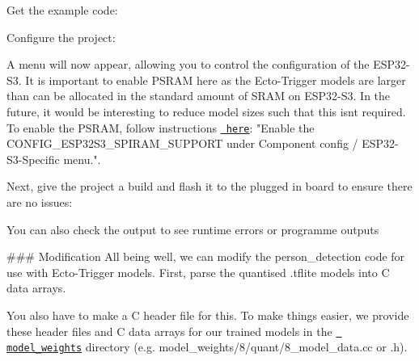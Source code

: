 \begin{adjustwidth}{1em}{0em}
Get the example code\+: 
\begin{DoxyCode}{0}

\end{DoxyCode}


Configure the project\+: 
\begin{DoxyCode}{0}

\end{DoxyCode}
 A menu will now appear, allowing you to control the configuration of the ESP32-\/\+S3. It is important to enable PSRAM here as the Ecto-\/\+Trigger models are larger than can be allocated in the standard amount of SRAM on ESP32-\/\+S3. In the future, it would be interesting to reduce model sizes such that this isn\textquotesingle{}t required. To enable the PSRAM, follow instructions \href{https://docs.espressif.com/projects/esp-idf/en/release-v4.4/esp32s3/api-guides/flash_psram_config.html}{\texttt{ here}}\+: "{}\+Enable the CONFIG\+\_\+\+ESP32\+S3\+\_\+\+SPIRAM\+\_\+\+SUPPORT under Component config / ESP32-\/\+S3-\/\+Specific menu."{}.

Next, give the project a build and flash it to the plugged in board to ensure there are no issues\+: 
\begin{DoxyCode}{0}

\end{DoxyCode}
 You can also check the output to see runtime errors or programme outputs 
\begin{DoxyCode}{0}

\end{DoxyCode}


\#\#\# Modification All being well, we can modify the {\ttfamily person\+\_\+detection} code for use with Ecto-\/\+Trigger models. First, parse the quantised {\ttfamily .tflite} models into C data arrays. 
\begin{DoxyCode}{0}

\end{DoxyCode}
 You also have to make a C header file for this. To make things easier, we provide these header files and C data arrays for our trained models in the \href{../model_weights/}{\texttt{ model\+\_\+weights}} directory (e.\+g. {\ttfamily model\+\_\+weights/8/quant/8\+\_\+model\+\_\+data.\+cc} or {\ttfamily .h}).


\end{adjustwidth}
